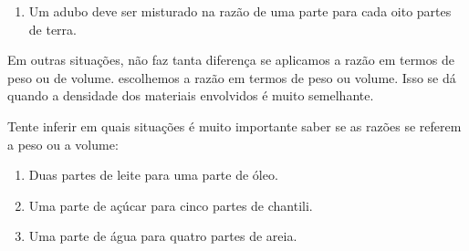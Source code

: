 \begin{knowledge}
\begin{enumerate}
\item {} 
Um adubo deve ser misturado na razão de uma parte para cada oito partes de terra.

\end{enumerate}

Em outras situações, não faz tanta diferença se aplicamos a razão em termos de peso ou de volume. escolhemos a razão em termos de peso ou volume. Isso se dá quando a densidade dos materiais envolvidos é muito semelhante.

Tente inferir em quais situações é muito importante saber se as razões se referem a peso ou a volume:
\begin{enumerate}
\item {} 
Duas partes de leite para uma parte de óleo.

\item {} 
Uma parte de açúcar para cinco partes de chantili.

\item {} 
Uma parte de água para quatro partes de areia.

\end{enumerate}
\end{knowledge}

